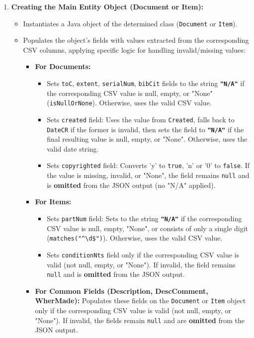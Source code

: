 \begin{enumerate}
    \item \textbf{Creating the Main Entity Object (Document or Item):}
        \begin{itemize}
            \item Instantiates a Java object of the determined class (\texttt{Document} or \texttt{Item}).
            \item Populates the object's fields with values extracted from the corresponding CSV columns, applying specific logic for handling invalid/missing values:
                \begin{itemize}
                    \item \textbf{For Documents:}
                        \begin{itemize}
                        \item Sets \texttt{toC}, \texttt{extent}, \texttt{serialNum}, \texttt{bibCit} fields to the string \textbf{\texttt{"N/A"}} if the corresponding CSV value is null, empty, or "None" (\texttt{isNullOrNone}). Otherwise, uses the valid CSV value.
                        \item Sets \texttt{created} field: Uses the value from \texttt{Created}, falls back to \texttt{DateCR} if the former is invalid, then sets the field to \textbf{\texttt{"N/A"}} if the final resulting value is null, empty, or "None". Otherwise, uses the valid date string.
                        \item Sets \texttt{copyrighted} field: Converts 'y' to \texttt{true}, 'n' or '0' to \texttt{false}. If the value is missing, invalid, or "None", the field remains \texttt{null} and is \textbf{omitted} from the JSON output (no "N/A" applied).
                        \end{itemize}
                    \item \textbf{For Items:}
                        \begin{itemize}
                        \item Sets \texttt{partNum} field: Sets to the string \textbf{\texttt{"N/A"}} if the corresponding CSV value is null, empty, "None", or consists of only a single digit (\texttt{matches("\^{}\textbackslash{}d\$")}). Otherwise, uses the valid CSV value.
                        \item Sets \texttt{conditionNts} field only if the corresponding CSV value is valid (not null, empty, or "None"). If invalid, the field remains \texttt{null} and is \textbf{omitted} from the JSON output.
                        \end{itemize}
                    \item \textbf{For Common Fields (Description, DescComment, WherMade):} Populates these fields on the \texttt{Document} or \texttt{Item} object only if the corresponding CSV value is valid (not null, empty, or "None"). If invalid, the fields remain \texttt{null} and are \textbf{omitted} from the JSON output.
                \end{itemize}
        \end{itemize}


\end{enumerate}
